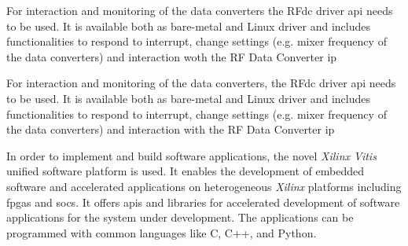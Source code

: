 For interaction and monitoring of the data converters the RFdc driver \gls{api} needs to be used.
It is available both as bare-metal and Linux driver and includes functionalities to respond to interrupt, change settings (e.g. mixer frequency of the data converters) and interaction woth the RF Data Converter \gls{ip}

For interaction and monitoring of the data converters, the RFdc driver \gls{api} needs to be used.
It is available both as bare-metal and Linux driver and includes functionalities to respond to interrupt, change settings (e.g. mixer frequency of the data converters) and interaction with the RF Data Converter \gls{ip}


In order to implement and build software applications, the novel \textit{Xilinx Vitis} unified software platform is used.
It enables the development of embedded software and accelerated applications on heterogeneous \textit{Xilinx} platforms including \glspl{fpga} and \glspl{soc}.
It offers \glspl{api} and libraries for accelerated development of software applications for the system under development.
The applications can be programmed with common languages like C, C++, and Python.
